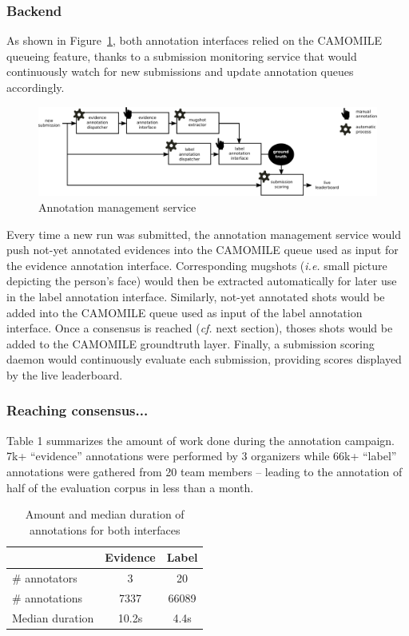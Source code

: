 \documentclass[10pt, a4paper]{article}
\begin{document}
\subsubsection{Backend}

As shown in Figure~\ref{fig:backend}, both annotation interfaces relied on the
CAMOMILE queueing feature, thanks to a submission monitoring service that would
continuously watch for new submissions and update annotation queues accordingly.

\begin{figure}[htb]
\centering
\includegraphics[width=1.\linewidth]{figs/backend.pdf}
\caption{Annotation management service}
\label{fig:backend}
\end{figure}

Every time a new run was submitted, the annotation management service would
push not-yet annotated evidences into the CAMOMILE queue used as input for the
evidence annotation interface. Corresponding mugshots (\emph{i.e.} small picture
depicting the person's face) would then be extracted automatically for later
use in the label annotation interface. Similarly, not-yet annotated shots would
be added into the CAMOMILE queue used as input of the label annotation interface.
Once a consensus is reached (\emph{cf.} next section), thoses shots would be
added to the CAMOMILE groundtruth layer. Finally, a submission scoring daemon
would continuously evaluate each submission, providing scores displayed by the
live leaderboard.

\subsubsection{Reaching consensus...}

Table 1 summarizes the amount of work done during the annotation campaign.
7k+ ``evidence'' annotations were performed by 3 organizers while 66k+ ``label''
annotations were gathered from 20 team members -- leading to the annotation of
half of the evaluation corpus in less than a month.

\begin{table}[ht]
  \centering
  \begin{tabular}{|l|c|c|}
    \hline
                           & Evidence  & Label      \\
    \hline
    \hline
    \# annotators           & 3         & 20         \\
    \# annotations          & 7337      & 66089      \\
    Median duration        & 10.2s     & 4.4s       \\
    \hline
  \end{tabular}
  \caption{Amount and median duration of annotations for both interfaces}
  \label{tab:annotations}
\end{table}
\end{document}
